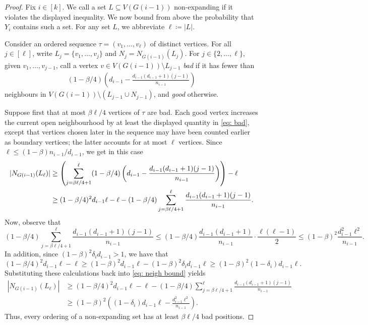 \documentclass[10pt,a4paper]{amsart}
\begin{document}
\begin{proof}
Fix $i\in [k]$. 
We call a set $L\subseteq V(G(i-1))$ non-expanding if it violates the displayed inequality. We now bound from above the probability that $Y_i$ contains such a set. For any set $L$, we abbreviate $\ell\coloneqq |L|$.

Consider an ordered sequence $\tau=(v_1,\ldots,v_\ell)$ of distinct vertices. 
For all $j\in [\ell]$, write $L_j=\{v_1,\ldots,v_j\}$ and $N_j=N_{G(i-1)}(L_j)$. For $j\in \{2,\ldots, \ell\}$, given $v_1,\ldots,v_{j-1}$, call a vertex $v\in V(G(i-1))\setminus L_{j-1}$ \textit{bad} if it has fewer than
\begin{align}
 (1-\beta/4)\left(d_{i-1}-\frac{d_{i-1}(d_{i-1}+1)(j-1)}{n_{i-1}}\right)\label{eq: bad}   
\end{align}
neighbours in $V(G(i-1))\setminus(L_{j-1}\cup N_{j-1})$, and \textit{good} otherwise.

Suppose first that at most $\beta\ell/4$ vertices of $\tau$ are bad. Each good vertex increases the current open neighbourhood by at least the displayed quantity in \eqref{eq: bad}, except that vertices chosen later in the sequence may have been counted earlier as boundary vertices; the latter accounts for at most $\ell$ vertices. Since $\ell\le(1-\beta)n_{i-1}/d_{i-1}$, we get in this case
\begin{align}\label{eq: neigh bound}
    |N_{G(i-1)}(L_\ell)|\notag
    &\ge \left(\sum_{j=\beta\ell/4+1}^{\ell}(1-\beta/4)\left(d_{i-1}-\frac{d_{i-1}(d_{i-1}+1)(j-1)}{n_{i-1}}\right)\right)-\ell \\
    &\ge (1-\beta/4)^2d_{i-1}\ell-\ell-(1-\beta/4)\sum_{j=\beta\ell/4+1}^\ell\frac{d_{i-1}(d_{i-1}+1)(j-1)}{n_{i-1}}.
\end{align}
Now, observe that 
\[
    (1-\beta/4)\sum_{j=\beta\ell/4+1}^\ell\frac{d_{i-1}(d_{i-1}+1)(j-1)}{n_{i-1}}\le (1-\beta/4)\frac{d_{i-1}(d_{i-1}+1)}{n_{i-1}}\cdot \frac{\ell(\ell-1)}{2}\le  (1-\beta)^2\frac{d_{i-1}^2\ell^2}{n_{i-1}}.
\]
In addition, since $(1-\beta)^2\delta_id_{i-1}>1$, we have that 
\[
    (1-\beta/4)^2d_{i-1}\ell-\ell\ge (1-\beta)^2d_{i-1}\ell-(1-\beta)^2\delta_id_{i-1}\ell\ge (1-\beta)^2(1-\delta_{i})d_{i-1}\ell.
\]
Substituting these calculations back into \eqref{eq: neigh bound} yields
\begin{align*}
    |N_{G(i-1)}(L_\ell)|
    &\ge (1-\beta/4)^2d_{i-1}\ell-\ell-(1-\beta/4)\sum_{j=\beta\ell/4+1}^\ell\frac{d_{i-1}(d_{i-1}+1)(j-1)}{n_{i-1}}\\
    &\ge (1-\beta)^2\left((1-\delta_{i})d_{i-1}\ell-\frac{d_{i-1}^2\ell^2}{n_{i-1}}\right).
\end{align*}
Thus, every ordering of a non-expanding set has at least $\beta\ell/4$ bad positions.


\end{proof}
\end{document}
